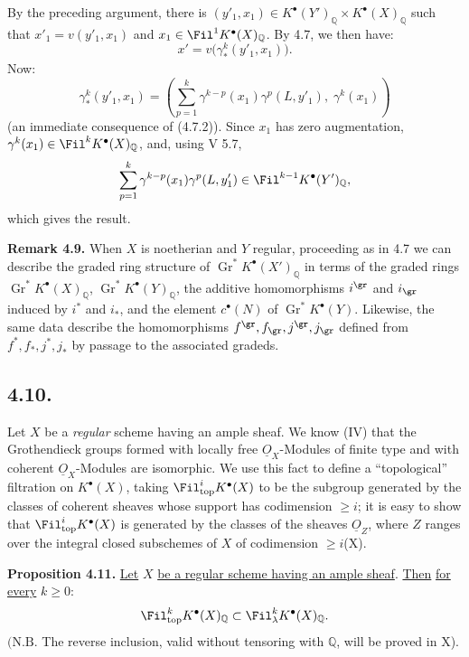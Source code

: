 By the preceding argument, there is \((y'_1,x_1)\in K^{\bullet}(Y')_{\mathbb Q}\times K^{\bullet}(X)_{\mathbb Q}\) such that \(x'_1=v(y'_1,x_1)\) and \(x_1\in\Fil^1K^{\bullet}(X)_{\mathbb Q}\). By 4.7, we then have:
\[
  x'=v\bigl(\gamma^k_*(y'_1,x_1)\bigr).
\]
Now:
\[
  \gamma^k_*(y'_1,x_1)
  =
  \left(\sum_{p=1}^{k}\gamma^{k-p}(x_1)\gamma^p(L,y'_1),\;
  \gamma^k(x_1)\right)
\]
(an immediate consequence of (4.7.2)). Since \(x_1\) has zero augmentation, \(\gamma^k(x_1)\in\Fil^kK^{\bullet}(X)_{\mathbb Q}\), and, using V 5.7,
\[
  \sum_{p=1}^{k}\gamma^{k-p}(x_1)\gamma^p(L,y'_1)
  \in\Fil^{k-1}K^{\bullet}(Y')_{\mathbb Q},
\]
which gives the result.

%
\textbf{Remark 4.9.} When \(X\) is noetherian and \(Y\) regular, proceeding as in 4.7 we can describe the graded ring structure of \(\operatorname{Gr}^*K^{\bullet}(X')_{\mathbb Q}\) in terms of the graded rings \(\operatorname{Gr}^*K^{\bullet}(X)_{\mathbb Q}\), \(\operatorname{Gr}^*K^{\bullet}(Y)_{\mathbb Q}\), the additive homomorphisms \(i^{\gr}\) and \(i_{\gr}\) induced by \(i^*\) and \(i_*\), and the element \(c^{\bullet}(N)\) of \(\operatorname{Gr}^*K^{\bullet}(Y)\). Likewise, the same data describe the homomorphisms \(f^{\gr},f_{\gr},j^{\gr},j_{\gr}\) defined from \(f^*,f_*,j^*,j_*\) by passage to the associated gradeds.

\subsection*{4.10.}

Let \(X\) be a \emph{regular} scheme having an ample sheaf. We know (IV\qquad) that the Grothendieck groups formed with locally free \(\underline{O}_X\)-Modules of finite type and with coherent \(\underline{O}_X\)-Modules are isomorphic. We use this fact to define a ``topological'' filtration on \(K^{\bullet}(X)\), taking \(\Fil^i_{\mathrm{top}}K^{\bullet}(X)\) to be the subgroup generated by the classes of coherent sheaves whose support has codimension \(\ge i\); it is easy to show that \(\Fil^i_{\mathrm{top}}K^{\bullet}(X)\) is generated by the classes of the sheaves \(\underline{O}_Z\), where \(Z\) ranges over the integral closed subschemes of \(X\) of codimension \(\ge i\)(X\qquad).

\textbf{Proposition 4.11.} \uline{Let} \(X\) \uline{be a regular scheme having an ample sheaf}. \uline{Then} \uline{for every} \(k\ge0\):
\[
  \Fil_{\mathrm{top}}^kK^{\bullet}(X)_{\mathbb Q}
  \subset
  \Fil_\lambda^kK^{\bullet}(X)_{\mathbb Q}.
\]
\((\mathrm{N.B.}\) The reverse inclusion, valid without tensoring with \(\mathbb Q\), will be proved in X\qquad).

